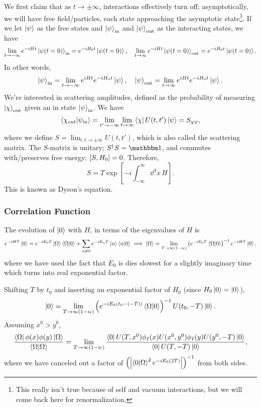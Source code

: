 \documentclass{article}
\begin{document}
We first claim that as $t\to\pm\infty$, interactions effectively turn off; asymptotically, we will have free field/particles, each state approaching the asymptotic state\footnote{This really isn't true because of self and vacuum interactions, but we will come back here for renormalization.}. If we let $\ket\psi$ as the free states and $\ket\psi_\text{in}$ and $\ket\psi_\text{out}$ as the interacting states, we have 
$$\lim_{t\to-\infty}e^{-iHt}\ket{\psi(t=0)}_\text{in}=e^{-iH_0t}\ket{\psi(t=0)},\quad \lim_{t\to\infty}e^{-iHt}\ket{\psi(t=0)}_\text{out}=e^{-iH_0t}\ket{\psi(t=0)}.$$
In other words, 
$$\ket\psi_\text{in}=\lim_{t\to-\infty}e^{iHt}e^{-iH_0t}\ket\psi,\quad\ket\psi_\text{out}=\lim_{t\to\infty}e^{iHt}e^{-iH_0t}\ket\psi.$$
We're interested in scattering amplitudes, defined as the probability of measuring $\ket\chi_\text{out}$ given an in state $\ket\psi_\text{in}$. We have 
$$\braket{\chi_\text{out}}{\psi_\text{in}}=\lim_{t'\to-\infty}\lim_{t\to\infty}\bra\chi U(t,t')\ket\psi=S_{\chi\psi},$$
where we define $S=\lim_{t,t\to\pm\infty}U(t,t')$, which is also called the scattering matrix. The $S$-matrix is unitary; $S^\dag S=\mathbbm 1$, and commutes with/preserves free energy; $\comm{S}{H_0}=0$. Therefore, 
\begin{equation}
    S=T\exp\left[-i\int^\infty_{-\infty}\dd^4x\,H\right].
\end{equation}
This is known as Dyson's equation. 

\subsubsection{Correlation Function}

The evolution of $\ket 0$ with $H$, in terms of the eigenvalues of $H$ is 
$$e^{-iHT}\ket 0=e^{-iE_0T}\ket\Omega\braket{\Omega}{0}+\sum_{n\ne 0}e^{-iE_nT}\ket n\braket{n}{0}\implies\ket\Omega=\lim_{T\to\infty(1-i\epsilon)}\left(e^{-iE_0T}\braket{\Omega}{0}\right)^{-1}e^{-iHT}\ket 0,$$
where we have used the fact that $E_0$ is dies slowest for a slightly imaginary time which turns into real exponential factor. 

Shifting $T$ by $t_0$ and inserting an exponential factor of $H_0$ (since $H_0\ket 0=\ket 0$), 
$$\ket 0=\lim_{T\to\infty(1-i\epsilon)}\left(e^{-iE_0(t_0-(-T))}\braket{\Omega}{0}\right)^{-1}U(t_0,-T)\ket 0.$$
Assuming $x^0>y^0$, 
$$\frac{\bra\Omega\phi(x)\phi(y)\ket\Omega}{\braket{\Omega}{\Omega}}=\lim_{T\to\infty(1-i\epsilon)}\frac{\bra 0U(T,x^0)\phi_I(x)U(x^0,y^0)\phi_I(y)U(y^0,-T)\ket 0}{\bra 0U(T,-T)\ket 0},$$
where we have canceled out a factor of $\left(\left\lvert\braket{0}{\Omega}^2e^{-iE_0(2T)}\right\rvert\right)^{-1}$ from both sides.
\end{document}
